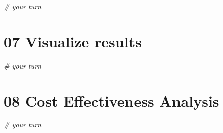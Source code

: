 \documentclass[
]{article}
\newenvironment{Shaded}{\begin{snugshade}}{\end{snugshade}}
\newcommand{\CommentTok}[1]{\textcolor[rgb]{0.56,0.35,0.01}{\textit{#1}}}
\begin{document}
\begin{Shaded}
\begin{Highlighting}[]
\CommentTok{# your turn}
\end{Highlighting}
\end{Shaded}

\hypertarget{visualize-results}{%
\section{07 Visualize results}\label{visualize-results}}

\begin{Shaded}
\begin{Highlighting}[]
\CommentTok{# your turn}
\end{Highlighting}
\end{Shaded}

\hypertarget{cost-effectiveness-analysis}{%
\section{08 Cost Effectiveness
Analysis}\label{cost-effectiveness-analysis}}

\begin{Shaded}
\begin{Highlighting}[]
\CommentTok{# your turn}
\end{Highlighting}
\end{Shaded}
\end{document}
